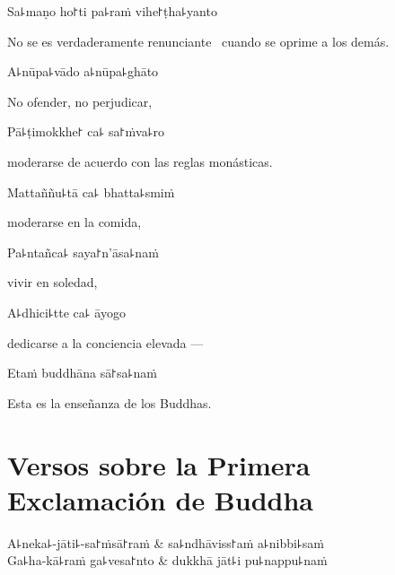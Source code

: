 Sa꜕maṇo ho꜓ti pa꜕raṁ vihe꜓ṭha꜕yanto

\begin{english}
  No se es verdaderamente renunciante \pause\ cuando se oprime a los demás.
\end{english}

A꜕nūpa꜕vādo a꜕nūpa꜕ghāto

\begin{english}
  No ofender, no perjudicar,
\end{english}

Pā꜕ṭimokkhe꜓ ca꜕ sa꜓ṁva꜕ro

\begin{english}
  moderarse de acuerdo con las reglas monásticas.
\end{english}

Mattaññu꜕tā ca꜕ bhatta꜕smiṁ

\begin{english}
  moderarse en la comida,
\end{english}

Pa꜕ntañca꜕ saya꜓n'āsa꜕naṁ

\begin{english}
  vivir en soledad,
\end{english}

A꜕dhici꜕tte ca꜕ āyogo

\begin{english}
  dedicarse a la conciencia elevada ---
\end{english}

Etaṁ buddhāna sā꜓sa꜕naṁ

\begin{english}
  Esta es la enseñanza de los Buddhas.
\end{english}

\chapter[La Primera Exclamación]{Versos sobre la Primera Exclamación de Buddha}


\begin{leader}
\end{leader}

\begin{twochants}
  A꜕neka꜕-jāti꜕-sa꜓ṁsā꜓raṁ & sa꜕ndhāviss꜓aṁ a꜕nibbi꜕saṁ \\
  Ga꜕ha-kā꜕raṁ ga꜕vesa꜓nto & dukkhā jāt꜕i pu꜕nappu꜕naṁ \\
\end{twochants}

